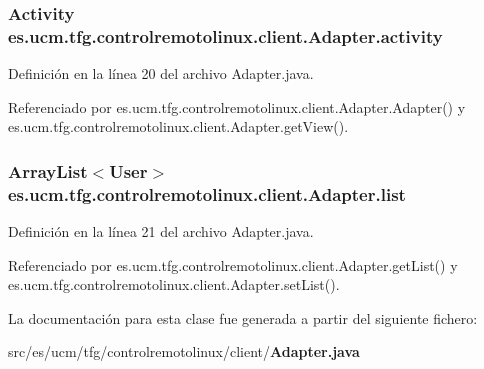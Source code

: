 \subsubsection[{activity}]{\setlength{\rightskip}{0pt plus 5cm}Activity es.\-ucm.\-tfg.\-controlremotolinux.\-client.\-Adapter.\-activity\hspace{0.3cm}{\ttfamily [private]}}\label{classes_1_1ucm_1_1tfg_1_1controlremotolinux_1_1client_1_1Adapter_a02633f345bdabbad6cfba01e289edc16}


Definición en la línea 20 del archivo Adapter.\-java.



Referenciado por es.\-ucm.\-tfg.\-controlremotolinux.\-client.\-Adapter.\-Adapter() y es.\-ucm.\-tfg.\-controlremotolinux.\-client.\-Adapter.\-get\-View().

\subsubsection[{list}]{\setlength{\rightskip}{0pt plus 5cm}Array\-List$<${\bf User}$>$ es.\-ucm.\-tfg.\-controlremotolinux.\-client.\-Adapter.\-list\hspace{0.3cm}{\ttfamily [private]}}\label{classes_1_1ucm_1_1tfg_1_1controlremotolinux_1_1client_1_1Adapter_aa2bb43cc4ff6edc74c89e501d95dfae1}


Definición en la línea 21 del archivo Adapter.\-java.



Referenciado por es.\-ucm.\-tfg.\-controlremotolinux.\-client.\-Adapter.\-get\-List() y es.\-ucm.\-tfg.\-controlremotolinux.\-client.\-Adapter.\-set\-List().



La documentación para esta clase fue generada a partir del siguiente fichero\-:\begin{DoxyCompactItemize}
\item 
src/es/ucm/tfg/controlremotolinux/client/{\bf Adapter.\-java}\end{DoxyCompactItemize}

